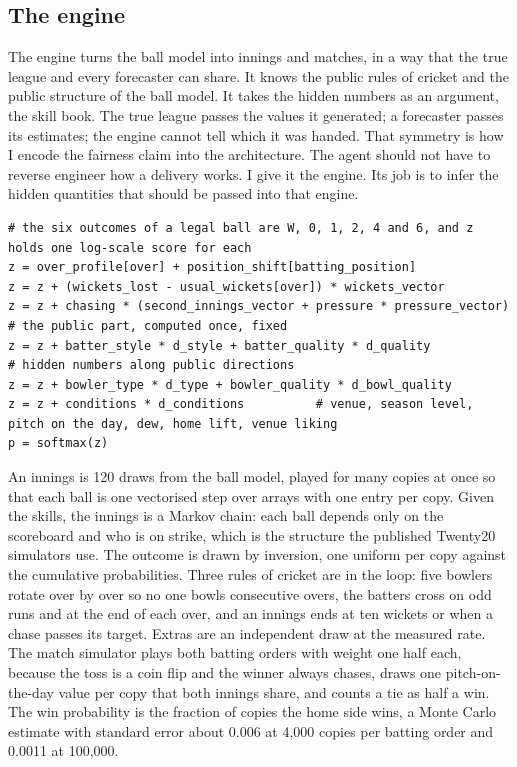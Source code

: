 \documentclass[11pt,letterpaper]{article}
\begin{document}
\subsection{The engine}

The engine turns the ball model into innings and matches, in a way that the true league and every forecaster can share. It knows the public rules of cricket and the public structure of the ball model. It takes the hidden numbers as an argument, the skill book. The true league passes the values it generated; a forecaster passes its estimates; the engine cannot tell which it was handed. That symmetry is how I encode the fairness claim into the architecture. The agent should not have to reverse engineer how a delivery works. I give it the engine. Its job is to infer the hidden quantities that should be passed into that engine.


\begin{lstlisting}
# the six outcomes of a legal ball are W, 0, 1, 2, 4 and 6, and z holds one log-scale score for each
z = over_profile[over] + position_shift[batting_position]
z = z + (wickets_lost - usual_wickets[over]) * wickets_vector
z = z + chasing * (second_innings_vector + pressure * pressure_vector)     # the public part, computed once, fixed
z = z + batter_style * d_style + batter_quality * d_quality               # hidden numbers along public directions
z = z + bowler_type * d_type + bowler_quality * d_bowl_quality
z = z + conditions * d_conditions          # venue, season level, pitch on the day, dew, home lift, venue liking
p = softmax(z)
\end{lstlisting}

An innings is 120 draws from the ball model, played for many copies at once so that each ball is one vectorised step over arrays with one entry per copy. Given the skills, the innings is a Markov chain: each ball depends only on the scoreboard and who is on strike, which is the structure the published Twenty20 simulators use. The outcome is drawn by inversion, one uniform per copy against the cumulative probabilities. Three rules of cricket are in the loop: five bowlers rotate over by over so no one bowls consecutive overs, the batters cross on odd runs and at the end of each over, and an innings ends at ten wickets or when a chase passes its target. Extras are an independent draw at the measured rate. The match simulator plays both batting orders with weight one half each, because the toss is a coin flip and the winner always chases, draws one pitch-on-the-day value per copy that both innings share, and counts a tie as half a win. The win probability is the fraction of copies the home side wins, a Monte Carlo estimate with standard error about 0.006 at 4,000 copies per batting order and 0.0011 at 100,000.
\end{document}
